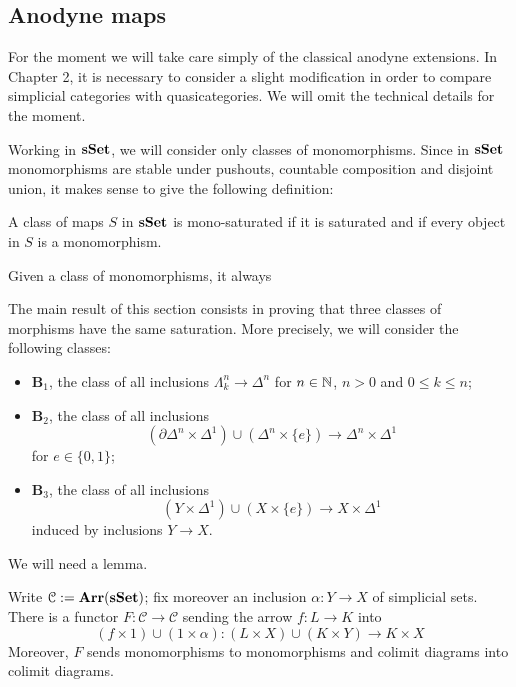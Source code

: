 \begin{refsection}
\subsection{Anodyne maps}

For the moment we will take care simply of the classical anodyne extensions. In Chapter 2, it is necessary to consider a slight modification in order to compare simplicial categories with quasicategories. We will omit the technical details for the moment.

Working in $\mathbf{sSet}$, we will consider only classes of monomorphisms. Since in $\mathbf{sSet}$ monomorphisms are stable under pushouts, countable composition and disjoint union, it makes sense to give the following definition:

\begin{defin}
A class of maps $S$ in $\mathbf{sSet}$ is mono-saturated if it is saturated and if every object in $S$ is a monomorphism.
\end{defin}

Given a class of monomorphisms, it always 

The main result of this section consists in proving that three classes of morphisms have the same saturation. More precisely, we will consider the following classes:
\begin{itemize}
\item $\mathbf B_1$, the class of all inclusions $\Lambda^n_k \to \Delta^n$ for $n \in \mathbb{N}$, $n > 0$ and $0 \le k \le n$;
\item $\mathbf B_2$, the class of all inclusions
\[
(\partial \Delta^n \times \Delta^1) \cup (\Delta^n \times \{e\}) \to \Delta^n \times \Delta^1
\]
for $e \in \{0,1\}$;
\item $\mathbf B_3$, the class of all inclusions
\[
(Y \times \Delta^1) \cup (X \times \{e\}) \to X \times \Delta^1
\]
induced by inclusions $Y \to X$.
\end{itemize}

We will need a lemma.

\begin{lemma}
Write $\mathcal C := \mathbf{Arr}(\mathbf{sSet})$; fix moreover an inclusion $\alpha \colon Y \to X$ of simplicial sets. There is a functor $F \colon \mathcal C \to \mathcal C$ sending the arrow $f \colon L \to K$ into
\[
(f \times 1) \cup (1 \times \alpha) \colon (L \times X) \cup (K \times Y) \to K \times X
\]
Moreover, $F$ sends monomorphisms to monomorphisms and colimit diagrams into colimit diagrams.
\end{lemma}


\end{refsection}
